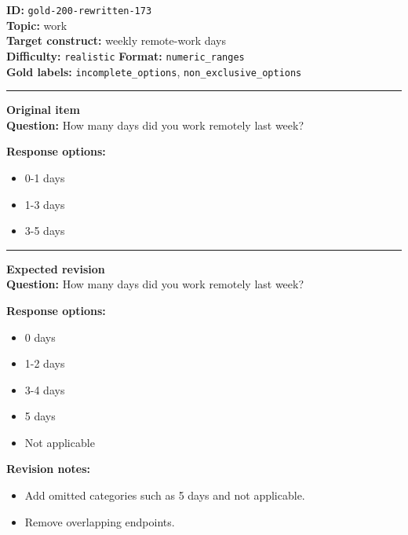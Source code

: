 \documentclass[10pt,a4paper]{article}
\newcommand{\sectionline}{\vspace{0.15em}\hrule\vspace{0.35em}}
\begin{document}
\begin{tcolorbox}[colframe=FlawRed,colback=white,colbacktitle=FlawRed!9,coltitle=black,title={Item 173\hfill Flawed item}]
\textbf{ID:} \texttt{gold-200-rewritten-173}\\
\textbf{Topic:} work\\
\textbf{Target construct:} weekly remote-work days\\
\textbf{Difficulty:} \texttt{realistic} \quad \textbf{Format:} \texttt{numeric\_ranges}\\
\textbf{Gold labels:} \texttt{incomplete\_options}, \texttt{non\_exclusive\_options}\\
\sectionline
\textbf{Original item}\\
\textbf{Question:} How many days did you work remotely last week?
\par\textbf{Response options:}
\begin{itemize}
\item 0-1 days
\item 1-3 days
\item 3-5 days
\end{itemize}
\sectionline
\textbf{Expected revision}\\
\textbf{Question:} How many days did you work remotely last week?
\par\textbf{Response options:}
\begin{itemize}
\item 0 days
\item 1-2 days
\item 3-4 days
\item 5 days
\item Not applicable
\end{itemize}
\par\textbf{Revision notes:}
\begin{itemize}
\item Add omitted categories such as 5 days and not applicable.
\item Remove overlapping endpoints.
\end{itemize}
\end{tcolorbox}
\end{document}
